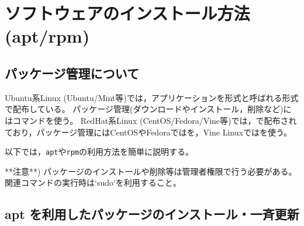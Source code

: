 \documentclass{jreport}
\begin{document}



\chapter{ソフトウェアのインストール方法(apt/rpm)}


\section{パッケージ管理について}


Ubuntu系Linux (Ubuntu/Mint等)では，アプリケーションを形式と呼ばれる形式で配布している。
パッケージ管理(ダウンロードやインストール，削除など)にはコマンドを使う。
RedHat系Linux (CentOS/Fedora/Vine等)では，で配布されており，パッケージ管理にはCentOSやFedoraではを，Vine Linuxではを使う。

以下では，\verb|apt|や\verb|rpm|の利用方法を簡単に説明する。

**注意**) パッケージのインストールや削除等は管理者権限で行う必要がある。関連コマンドの実行時は`sudo`を利用すること。


\section{apt を利用したパッケージのインストール・一斉更新\label{sec:apt}}
\end{document}
